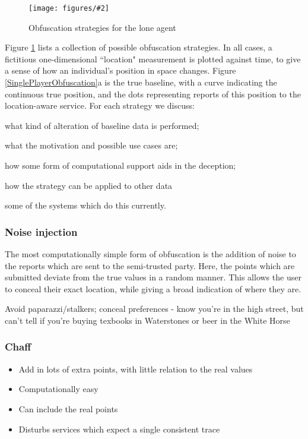 \documentclass{IOS-Book-Article}     %
\newcommand{\fig}[3][0.9]{
\begin{figure}[tp]
\begin{center}
\texttt{[image: figures/\#2]}
\caption{#3}
\label{fig:#2}
\end{center}
\end{figure}
}
\newcommand{\tbox}[3][red]{{
\color{#1}\noindent{
   \fbox{\scriptsize{ {\bf #2} \textsl{#3}}}
   \vspace{2pt}
}
}}
\newcommand{\todo}[1]{\tbox{TODO:}{#1}}
\begin{document}
\fig[1.05]{SinglePlayerObfuscation}{Obfuscation strategies for the lone agent}
Figure \ref{fig:SinglePlayerObfuscation} lists a collection of possible
obfuscation strategies. In all cases, a fictitious one-dimensional ``location"
measurement is plotted against time, to give a sense of how an
individual's position in space changes. Figure \ref{SinglePlayerObfuscation}a is
the true baseline, with a curve indicating the continuous true position, and the dots
representing reports of this position to the location-aware service. For each
strategy we discuss: \begin{inparaenum}
\item what kind of alteration of baseline data is performed;
\item what the motivation and possible use cases are;
\item how some form of computational support aids in the deception;
\item how the strategy can be applied to other data
\item some of the systems which do this currently.
\end{inparaenum}

\subsubsection{Noise injection}

The most computationally simple form of obfuscation is the addition of noise to
the reports which are sent to the semi-trusted party. Here, the points which are
submitted deviate from the true values in a random manner. This allows the user
to conceal their exact location, while giving a broad indication of where they
are.

\todo{Why?} Avoid paparazzi/stalkers; conceal preferences - know you're in the
high street, but can't tell if you're buying texbooks in Waterstones or beer in
the White Horse

\subsubsection{Chaff}
\begin{itemize}
  \item Add in lots of extra points, with little relation to the real values
  \item Computationally easy
  \item Can include the real points
  \item Disturbs services which expect a single consistent trace
\end{itemize}
\end{document}
